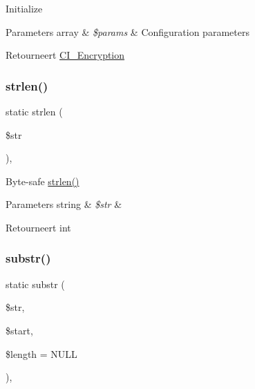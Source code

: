 Initialize


\begin{DoxyParams}[1]{Parameters}
array & {\em \$params} & Configuration parameters \\
\hline
\end{DoxyParams}
\begin{DoxyReturn}{Retourneert}
\mbox{\hyperlink{class_c_i___encryption}{C\+I\+\_\+\+Encryption}} 
\end{DoxyReturn}
\mbox{\label{class_c_i___encryption_a4c29a687d4ed62c26a10e41d98930d5f}} 
\subsubsection{\texorpdfstring{strlen()}{strlen()}}
{\footnotesize\ttfamily static strlen (\begin{DoxyParamCaption}\item[{}]{\$str }\end{DoxyParamCaption})\hspace{0.3cm}{\ttfamily [static]}, {\ttfamily [protected]}}

Byte-\/safe \mbox{\hyperlink{class_c_i___encryption_a4c29a687d4ed62c26a10e41d98930d5f}{strlen()}}


\begin{DoxyParams}[1]{Parameters}
string & {\em \$str} & \\
\hline
\end{DoxyParams}
\begin{DoxyReturn}{Retourneert}
int 
\end{DoxyReturn}
\mbox{\label{class_c_i___encryption_a101caef57ef0b165da5747e2c2e6c9dc}} 
\subsubsection{\texorpdfstring{substr()}{substr()}}
{\footnotesize\ttfamily static substr (\begin{DoxyParamCaption}\item[{}]{\$str,  }\item[{}]{\$start,  }\item[{}]{\$length = {\ttfamily NULL} }\end{DoxyParamCaption})\hspace{0.3cm}{\ttfamily [static]}, {\ttfamily [protected]}}

